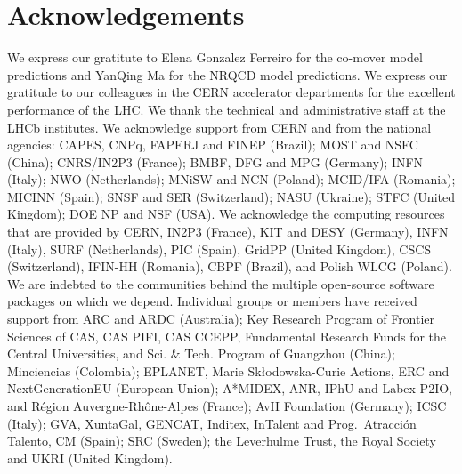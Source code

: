 \section*{Acknowledgements}
%
%
We express our gratitute to Elena Gonzalez Ferreiro for the co-mover model predictions and YanQing Ma for the NRQCD model predictions.
We express our gratitude to our colleagues in the CERN
accelerator departments for the excellent performance of the LHC. We
thank the technical and administrative staff at the LHCb
institutes.
We acknowledge support from CERN and from the national agencies:
CAPES, CNPq, FAPERJ and FINEP (Brazil); 
MOST and NSFC (China); 
CNRS/IN2P3 (France); 
BMBF, DFG and MPG (Germany); 
INFN (Italy); 
NWO (Netherlands); 
MNiSW and NCN (Poland); 
MCID/IFA (Romania); 
MICINN (Spain); 
SNSF and SER (Switzerland); 
NASU (Ukraine); 
STFC (United Kingdom); 
DOE NP and NSF (USA).
We acknowledge the computing resources that are provided by CERN, IN2P3
(France), KIT and DESY (Germany), INFN (Italy), SURF (Netherlands),
PIC (Spain), GridPP (United Kingdom), 
CSCS (Switzerland), IFIN-HH (Romania), CBPF (Brazil),
and Polish WLCG (Poland).
We are indebted to the communities behind the multiple open-source
software packages on which we depend.
Individual groups or members have received support from
ARC and ARDC (Australia);
Key Research Program of Frontier Sciences of CAS, CAS PIFI, CAS CCEPP, 
Fundamental Research Funds for the Central Universities, 
and Sci. \& Tech. Program of Guangzhou (China);
Minciencias (Colombia);
EPLANET, Marie Sk\l{}odowska-Curie Actions, ERC and NextGenerationEU (European Union);
A*MIDEX, ANR, IPhU and Labex P2IO, and R\'{e}gion Auvergne-Rh\^{o}ne-Alpes (France);
AvH Foundation (Germany);
ICSC (Italy); 
GVA, XuntaGal, GENCAT, Inditex, InTalent and Prog.~Atracci\'on Talento, CM (Spain);
SRC (Sweden);
the Leverhulme Trust, the Royal Society
 and UKRI (United Kingdom).